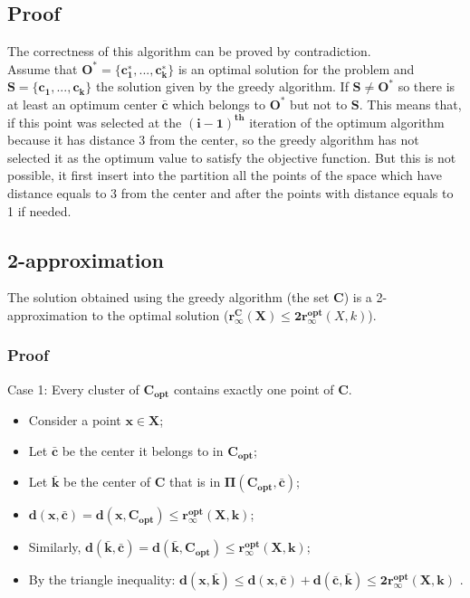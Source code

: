 \documentclass[11pt]{article}
\begin{document}
\subsection{Proof}
The correctness of this algorithm can be proved by contradiction.\\
Assume that $\mathbf{O^{*} = \{c^{∗}_{1},...,c^{∗}_{k}\}}$ is an optimal solution for the problem and $\mathbf{S = \{c_{1},...,c_{k}\}}$ the solution given by the greedy algorithm. If $\mathbf{S \ne O^{*}}$ so there is at
least an optimum center $\mathbf{\bar{c}}$
which belongs to $\mathbf{O^{*}}$ but not to $\mathbf{S}$. This means that, if this point was selected at the $\mathbf{(i-1)^{th}}$ iteration of the optimum
algorithm because it has distance 3 from the center, so the greedy algorithm has
not selected it as the optimum value to satisfy the objective function. But
this is not possible, it first insert into the partition all
the points of the space which have distance equals to 3 from the center
and after the points with distance equals to 1 if needed.

\subsection{2-approximation}
The solution obtained using the greedy algorithm (the set $\mathbf{C}$) is a 2-approximation to the optimal solution ($\mathbf{r^{C}_{\infty}(X) \le 2r^{opt}_{\infty}}(X,k)$). 

\subsubsection{Proof}
Case 1: Every cluster of $\mathbf{C_{opt}}$ contains exactly one point of $\mathbf{C}$. 
\begin{itemize}
	\item Consider a point $\mathbf{x \in X}$;
	\item Let $\mathbf{\bar{c}}$ be the center it belongs to in $\mathbf{C_{opt}}$;
	\item Let $\mathbf{\bar{k}}$ be the center of $\mathbf{C}$ that is in $\mathbf{\Pi(C_{opt},\bar{c})}$;
	\item $\mathbf{d(x,\bar{c}) = d(x,C_{opt}) \le r^{opt}_{\infty}(X,k)}$;
	\item Similarly, $\mathbf{d(\bar{k},\bar{c}) = d(\bar{k},C_{opt}) \le r^{opt}_{\infty}(X,k)}$;
	\item By the triangle inequality: $\mathbf{d(x,\bar{k}) \le d(x,\bar{c}) + d(\bar{c},\bar{k}) \le 2r^{opt}_{\infty}(X,k)}$	.
\end{itemize}
\end{document}
